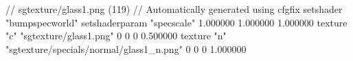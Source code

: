 // sgtexture/glass1.png (119)
// Automatically generated using cfgfix
setshader "bumpspecworld"
setshaderparam "specscale" 1.000000 1.000000 1.000000
texture "c" "sgtexture/glass1.png" 0 0 0 0.500000
texture "n" "sgtexture/specials/normal/glass1_n.png" 0 0 0 1.000000
